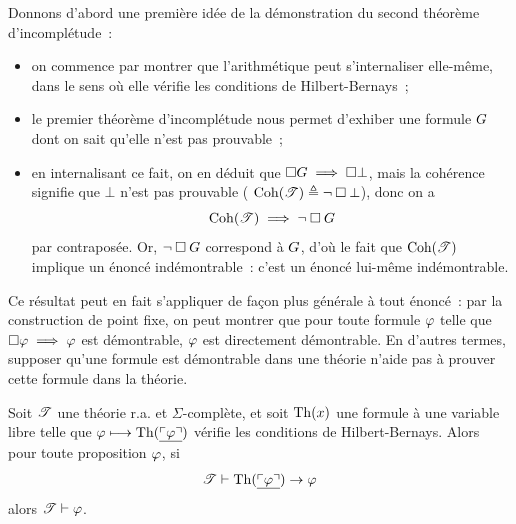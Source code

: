 Donnons d'abord une première idée de la démonstration du second théorème
d'incomplétude~:
\begin{itemize}
\item on commence par montrer que l'arithmétique peut s'internaliser
  elle-même, dans le sens où elle vérifie les conditions de Hilbert-Bernays~;
\item le premier théorème d'incomplétude nous permet d'exhiber une formule
  $G$ dont on sait qu'elle n'est pas prouvable~;
\item en internalisant ce fait, on en déduit que
  $\mathbin{\square}G \implies \mathbin{\square} \bot$, mais la cohérence signifie que
  $\bot$ n'est pas prouvable (
  $\operatorname{Coh}(\mathscr T) \triangleq \lnot\mathbin{\square} \bot$), donc on a
  \[\operatorname{Coh}(\mathscr T) \implies \lnot\mathbin{\square} G\]
  par contraposée.
  Or, $\lnot\mathbin{\square}G$ correspond à $G$, d'où le fait que
  $\operatorname{Coh}(\mathscr T)$ implique un énoncé indémontrable~: c'est un énoncé
  lui-même indémontrable.
\end{itemize}
Ce résultat peut en fait s'appliquer de façon plus générale à tout énoncé~:
par la construction de point fixe, on peut montrer que pour toute formule
$\varphi$ telle que $\mathbin{\square} \varphi \implies \varphi$ est démontrable, $\varphi$
est directement démontrable. En d'autres termes, supposer qu'une formule est
démontrable dans une théorie n'aide pas à prouver cette formule dans la théorie.

\begin{theorem}\label{thm.Lob}
  Soit $\mathscr T$ une théorie r.a. et $\Sigma$-complète, et soit $\operatorname{Th}(x)$ une
  formule à une variable libre telle que
  $\varphi \longmapsto \operatorname{Th}(\underline{\ulcorner\varphi\urcorner})$ vérifie les conditions de
  Hilbert-Bernays. Alors pour toute proposition $\varphi$, si
  \[\mathscr T \vdash \operatorname{Th}(\underline{\ulcorner\varphi\urcorner}) \to \varphi\]
  alors $\mathscr T \vdash \varphi$.
\end{theorem}

